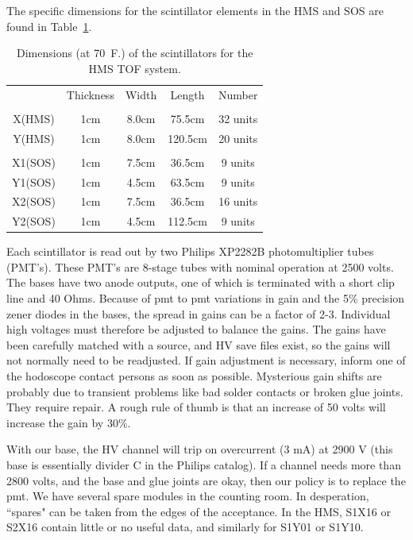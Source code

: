 	The specific dimensions for the scintillator elements in the HMS
and SOS are found in Table~\ref{tab:tof_scintillators}.
\begin{table}
\caption{Dimensions (at 70~F.) of the scintillators for the HMS TOF system. 
\label{tab:tof_scintillators}}
\begin{center}
  \begin{tabular}{ccccc}
	&Thickness	&Width		&Length		&Number	\\
	&		&		&		&	\\
\hline
X(HMS)	&	1cm	&	8.0cm	&	75.5cm	&32 units\\
Y(HMS)	&	1cm	&	8.0cm	&	120.5cm	&20 units\\
	&		&		&		&	\\
X1(SOS) &       1cm     &       7.5cm   &       36.5cm  &9 units\\
Y1(SOS) &       1cm     &       4.5cm   &       63.5cm  &9 units\\
X2(SOS) &       1cm     &       7.5cm   &       36.5cm  &16 units\\
Y2(SOS) &       1cm     &       4.5cm   &       112.5cm &9 units\\
  \end{tabular}
\end{center}
\end{table}
Each scintillator is read out by two Philips XP2282B photomultiplier
tubes (PMT's). These PMT's are 8-stage tubes with nominal operation at
2500 volts. The bases have two anode outputs, one of which is terminated with a
short clip line and 40 Ohms.  Because of pmt to pmt variations in gain and the
5\% precision zener diodes in the bases, the spread in gains can be a factor of
2-3. Individual high voltages must therefore be adjusted to balance the gains.
The gains have been carefully matched with a source, and HV save files exist,
so the gains will not normally need to be readjusted. If gain adjustment is
necessary, inform one of the hodoscope contact persons as soon as possible.
Mysterious gain shifts are probably due to transient problems like bad solder
contacts or broken glue joints. They require repair. A rough rule of thumb is
that an increase of 50 volts will increase the gain by 30\%.

With our base, the HV channel will trip on overcurrent (3 mA) at 2900 V
(this base is essentially divider C in the Philips catalog). If a channel needs
more than 2800 volts, and the base and glue joints are okay, then our policy
is to replace the pmt. We have several spare modules in the counting room.
In desperation, ``spares" can be taken from the edges of the acceptance. In the
HMS, S1X16 or S2X16 contain little or no useful data, and similarly for S1Y01
or S1Y10.


